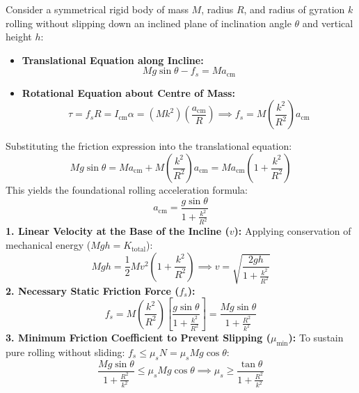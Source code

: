 \documentclass[10pt,twoside,openright]{book}
\begin{document}
\begin{formulabox}
Consider a symmetrical rigid body of mass $M$, radius $R$, and radius of gyration $k$ rolling without slipping down an inclined plane of inclination angle $\theta$ and vertical height $h$:
\begin{itemize}[leftmargin=1.2em, itemsep=2pt]
  \item \textbf{Translational Equation along Incline:}
  \[
    Mg\sin\theta - f_s = M a_{\text{cm}}
  \]
  \item \textbf{Rotational Equation about Centre of Mass:}
  \[
    \tau = f_s R = I_{\text{cm}}\alpha = (M k^2)\left(\frac{a_{\text{cm}}}{R}\right) \implies f_s = M\left(\frac{k^2}{R^2}\right)a_{\text{cm}}
  \]
\end{itemize}
Substituting the friction expression into the translational equation:
\begin{equation}
  Mg\sin\theta = M a_{\text{cm}} + M\left(\frac{k^2}{R^2}\right)a_{\text{cm}} = M a_{\text{cm}}\left(1 + \frac{k^2}{R^2}\right)
\end{equation}
This yields the foundational rolling acceleration formula:
\begin{equation}
  a_{\text{cm}} = \frac{g\sin\theta}{1 + \frac{k^2}{R^2}}
\end{equation}
\textbf{1. Linear Velocity at the Base of the Incline ($v$):} Applying conservation of mechanical energy ($Mgh = K_{\text{total}}$):
\begin{equation}
  Mgh = \frac{1}{2}M v^2\left(1 + \frac{k^2}{R^2}\right) \implies v = \sqrt{\frac{2gh}{1 + \frac{k^2}{R^2}}}
\end{equation}
\textbf{2. Necessary Static Friction Force ($f_s$):}
\begin{equation}
  f_s = M\left(\frac{k^2}{R^2}\right)\left[\frac{g\sin\theta}{1 + \frac{k^2}{R^2}}\right] = \frac{Mg\sin\theta}{1 + \frac{R^2}{k^2}}
\end{equation}
\textbf{3. Minimum Friction Coefficient to Prevent Slipping ($\mu_{\min}$):}
To sustain pure rolling without sliding: $f_s \le \mu_s N = \mu_s Mg\cos\theta$:
\begin{equation}
  \frac{Mg\sin\theta}{1 + \frac{R^2}{k^2}} \le \mu_s Mg\cos\theta \implies \mu_s \ge \frac{\tan\theta}{1 + \frac{R^2}{k^2}}
\end{equation}
\end{formulabox}
\end{document}
